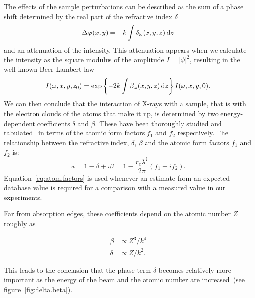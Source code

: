 The effects of the sample perturbations can be described as the sum of
a phase shift determined by the real part of the refractive index $\delta$
\begin{equation}
    \Delta\varphi(x, y) = -k \int \delta_\omega(x, y, z) \operatorname{d}\!{z}
    \label{eq:phase.deviation}
\end{equation}
and an attenuation of the intensity. This attenuation appears when we
calculate the intensity as the square modulus of the
amplitude $I = |\psi|^2$, resulting in the well-known Beer-Lambert law
\begin{equation}
    I(\omega, x, y, z_0) = \exp\left\{-2k\int \beta_\omega(x, y, z) \operatorname{d}\!{z}\right\}
    I(\omega, x, y, 0).\label{eq:beer-lambert}
\end{equation}
We can then conclude that the interaction of X-rays with a sample, that is
with the electron clouds of the atoms that make it up, is determined by
two energy-dependent coefficients $\delta$ and $\beta$. These have been
thoroughly studied and tabulated~\parencite{NIST} in terms of the atomic form
factors $f_1$ and $f_2$ respectively. The relationship between the
refractive index, $\delta$, $\beta$ and the atomic form factors $f_1$ and
$f_2$ is:
\begin{equation}
    n = 1 - \delta + i\beta = 1 - \frac{r_e\lambda^2}{2\pi}(f_1 + if_2).
    \label{eq:atom.factors}
\end{equation}
Equation~\eqref{eq:atom.factors} is used whenever an estimate from an
expected database value is required for a comparison with a measured
value in our experiments.

Far from absorption edges, these coefficients depend on the atomic number
$Z$ roughly as~\parencite{knoll2000radiation,Momose2005}

\begin{align}
    \beta &\propto Z^3 / k^4\\
    \delta &\propto Z / k^2.
    \label{eq:delta.beta.energy}
\end{align}

This leads to the conclusion that the phase term $\delta$ becomes
relatively more important as the energy of the beam and the atomic number
are increased~(see figure~\ref{fig:delta.beta}).

